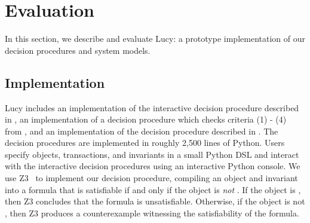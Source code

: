 \section{Evaluation}
In this section, we describe and evaluate Lucy: a prototype implementation of
our decision procedures and system models.

\subsection{Implementation}
Lucy includes an implementation of the interactive decision procedure described
in , an implementation of a decision
procedure which checks criteria (1) - (4) from , and an
implementation of the decision procedure described in
. The decision procedures
are implemented in roughly 2,500 lines of Python. Users specify objects,
transactions, and invariants in a small Python DSL and interact with the
interactive decision procedures using an interactive Python console. We use
Z3~\cite{de2008z3} to implement our \invariantclosure{} decision procedure,
compiling an object and invariant into a formula that is satisfiable if and
only if the object is \emph{not} \invariantclosed{}. If the object is
\invariantclosed{}, then Z3 concludes that the formula is unsatisfiable.
Otherwise, if the object is not \invariantclosed{}, then Z3 produces a
counterexample witnessing the satisfiability of the formula.

